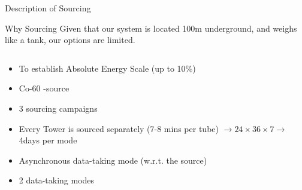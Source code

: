 \documentclass[pdf, 9pt]{beamer}
\begin{document}
  \begin{frame}{Description of Sourcing}
    \begin{block}{Why Sourcing}
      Given that our system is located 100m underground, and weighs like a tank, our options are limited.
    \end{block}
    \begin{columns}[T]
      \begin{column}{0.65\textwidth}
        \begin{itemize}
          \item To establish Absolute Energy Scale (up to 10\%)
          \item Co-60 \gamma-source
          \item 3 sourcing campaigns
            \begin{itemize}
            \end{itemize}
          \item Every Tower is sourced separately (7-8 mins per tube) $\rightarrow 24\times36\times7 \rightarrow$ 4days per mode
          \item Asynchronous data-taking mode (w.r.t. the source)
          \item 2 data-taking modes
            \begin{itemize}
            \end{itemize}
        \end{itemize}
      \end{column}
      \begin{column}{0.35\textwidth}

\end{column}
\end{columns}
\end{frame}
\end{document}

